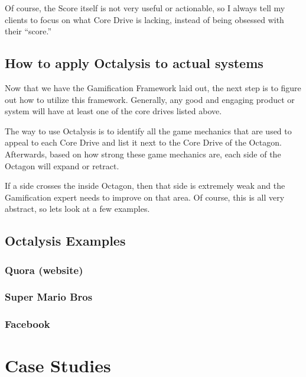 \documentclass[
]{book}
\begin{document}
Of course, the Score itself is not very useful or actionable, so I always tell my clients to focus on what Core Drive is lacking, instead of being obsessed with their ``score.''

\hypertarget{how-to-apply-octalysis-to-actual-systems}{%
\section{How to apply Octalysis to actual systems}\label{how-to-apply-octalysis-to-actual-systems}}

Now that we have the Gamification Framework laid out, the next step is to figure out how to utilize this framework. Generally, any good and engaging product or system will have at least one of the core drives listed above.

The way to use Octalysis is to identify all the game mechanics that are used to appeal to each Core Drive and list it next to the Core Drive of the Octagon. Afterwards, based on how strong these game mechanics are, each side of the Octagon will expand or retract.

If a side crosses the inside Octagon, then that side is extremely weak and the Gamification expert needs to improve on that area. Of course, this is all very abstract, so lets look at a few examples.

\hypertarget{octalysis-examples}{%
\section{Octalysis Examples}\label{octalysis-examples}}

\hypertarget{quora-website}{%
\subsection{Quora (website)}\label{quora-website}}

\hypertarget{super-mario-bros}{%
\subsection{Super Mario Bros}\label{super-mario-bros}}

\hypertarget{facebook}{%
\subsection{Facebook}\label{facebook}}

\hypertarget{case-studies}{%
\chapter{Case Studies}\label{case-studies}}
\end{document}
